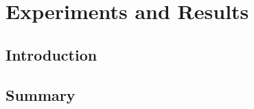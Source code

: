 \chapter{Experiments and Results} \label{chapter:expts}

\section{Introduction} \label{sec:expts:intro}

\section{Summary} \label{sec:expts:summary}